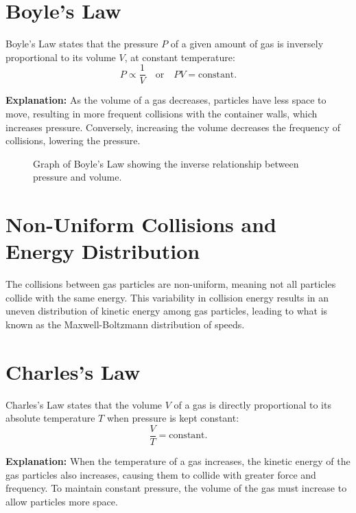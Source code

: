 \documentclass{report}
\begin{document}
\section{Boyle's Law}
Boyle's Law states that the pressure \( P \) of a given amount of gas is inversely proportional to its volume \( V \), at constant temperature:
\[
	P \propto \frac{1}{V} \quad \text{or} \quad PV = \text{constant}.
\]

\noindent \textbf{Explanation:} As the volume of a gas decreases, particles have less space to move, resulting in more frequent collisions with the container walls, which increases pressure. Conversely, increasing the volume decreases the frequency of collisions, lowering the pressure.

\begin{figure}[h]
	\centering
	\caption{Graph of Boyle's Law showing the inverse relationship between pressure and volume.}
\end{figure}

\section{Non-Uniform Collisions and Energy Distribution}
The collisions between gas particles are non-uniform, meaning not all particles collide with the same energy. This variability in collision energy results in an uneven distribution of kinetic energy among gas particles, leading to what is known as the Maxwell-Boltzmann distribution of speeds.

\section{Charles's Law}
Charles's Law states that the volume \( V \) of a gas is directly proportional to its absolute temperature \( T \) when pressure is kept constant:
\[
	\frac{V}{T} = \text{constant}.
\]

\noindent \textbf{Explanation:} When the temperature of a gas increases, the kinetic energy of the gas particles also increases, causing them to collide with greater force and frequency. To maintain constant pressure, the volume of the gas must increase to allow particles more space.
\end{document}
